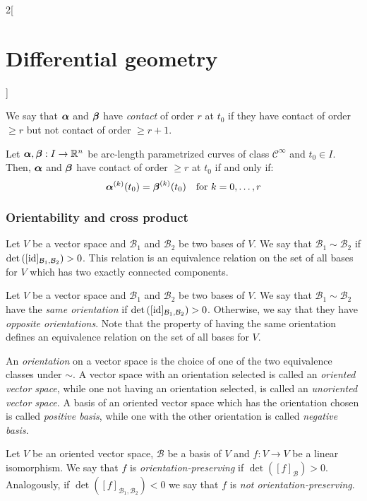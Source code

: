 \documentclass[../../../main.tex]{subfiles}
\begin{document}
\begin{multicols}{2}[\section{Differential geometry}]
\begin{definition}
    We say that $\boldsymbol{\mathrm{\alpha}}$ and $\boldsymbol{\mathrm{\beta}}$ have \emph{contact} of order $r$ at $t_0$ if they have contact of order $\geq r$ but not contact of order $\geq r+1$.
  \end{definition}
  \begin{prop}
    Let $\boldsymbol{\mathrm{\alpha}},\boldsymbol{\mathrm{\beta}}:I\rightarrow\mathbb{R}^n$ be arc-length parametrized curves of class $\mathcal{C}^\infty$ and $t_0\in I$. Then, $\boldsymbol{\mathrm{\alpha}}$ and $\boldsymbol{\mathrm{\beta}}$ have contact of order $\geq r$ at $t_0$ if and only if: $$\boldsymbol{\mathrm{\alpha}}^{(k)}(t_0)=\boldsymbol{\mathrm{\beta}}^{(k)}(t_0)\quad\text{for }k=0,\ldots,r$$
  \end{prop}
  \subsubsection{Orientability and cross product}
  \begin{definition}
    Let $V$ be a vector space and $\mathcal{B}_1$ and $\mathcal{B}_2$ be two bases of $V$. We say that $\mathcal{B}_1\sim\mathcal{B}_2$ if $\det\left([\mathrm{id}]_{\mathcal{B}_1,\mathcal{B}_2}\right)>0$. This relation is an equivalence relation on the set of all bases for $V$ which has two exactly connected components.
  \end{definition}
  \begin{definition}
    Let $V$ be a vector space and $\mathcal{B}_1$ and $\mathcal{B}_2$ be two bases of $V$. We say that $\mathcal{B}_1\sim\mathcal{B}_2$ have the \emph{same orientation} if $\det\left([\mathrm{id}]_{\mathcal{B}_1,\mathcal{B}_2}\right)>0$. Otherwise, we say that they have \emph{opposite orientations}. Note that the property of having the same orientation defines an equivalence relation on the set of all bases for $V$.
  \end{definition}
  \begin{definition}
    An \emph{orientation} on a vector space is the choice of one of the two equivalence classes under $\sim$. A vector space with an orientation selected is called an \emph{oriented vector space}, while one not having an orientation selected, is called an \emph{unoriented vector space}. A basis of an oriented vector space which has the orientation chosen is called \emph{positive basis}, while one with the other orientation is called \emph{negative basis}.
  \end{definition}
  \begin{definition}
    Let $V$ be an oriented vector space, $\mathcal{B}$ be a basis of $V$ and $f:V\rightarrow V$ be a linear isomorphism. We say that $f$ is \emph{orientation-preserving} if $\det \left([f]_{\mathcal{B}}\right)>0$. Analogously, if $\det \left([f]_{\mathcal{B}_1,\mathcal{B}_2}\right)<0$ we say that $f$ is \emph{not orientation-preserving}.

\end{definition}
\end{multicols}
\end{document}
